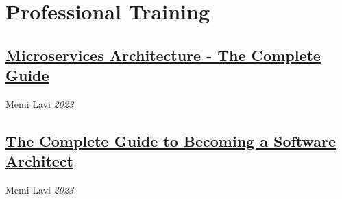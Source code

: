 %
%
%
\section{Professional Training}
%
%
\subsection{\href{https://www.udemy.com/certificate/UC-a8db49e4-26b6-4fa6-b156-d1cc5423de7f/}{Microservices Architecture - The Complete Guide}}
Memi Lavi \textit{2023}
\subsection{\href{https://www.udemy.com/certificate/UC-fbe5142e-d448-439a-a4b9-59893a0102ba/}{The Complete Guide to Becoming a Software Architect}}
Memi Lavi \textit{2023}
%
%	
